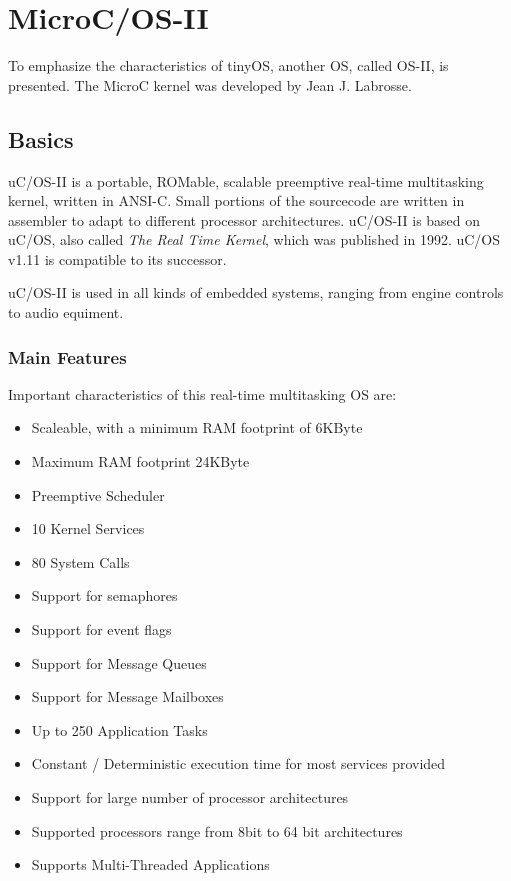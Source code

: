 
\chapter{MicroC/OS-II} \label{chapter:osII}

To emphasize the characteristics of tinyOS, another OS, called OS-II, is presented. 
The MicroC kernel was developed by Jean J. Labrosse.

\section{Basics}

uC/OS-II is a portable, ROMable, scalable preemptive real-time multitasking kernel, written in ANSI-C. Small portions of the sourcecode are written in assembler to adapt to different processor architectures. uC/OS-II is based on uC/OS, also called \textit{The Real Time Kernel}, which was published in 1992. uC/OS v1.11 is compatible to its successor.

uC/OS-II is used in all kinds of embedded systems, ranging from engine controls to audio equiment.

\subsection{Main Features}

Important characteristics of this real-time multitasking OS are:

\begin{itemize}
 \item Scaleable, with a minimum RAM footprint of 6KByte
 \item Maximum RAM footprint 24KByte
 \item Preemptive Scheduler
 \item 10 Kernel Services
 \item 80 System Calls
 \item Support for semaphores
 \item Support for event flags
 \item Support for Message Queues
 \item Support for Message Mailboxes
 \item Up to 250 Application Tasks
 \item Constant / Deterministic execution time for most services provided
 \item Support for large number of processor architectures
 \item Supported processors range from 8bit to 64 bit architectures
 \item Supports Multi-Threaded Applications 
\end{itemize}

